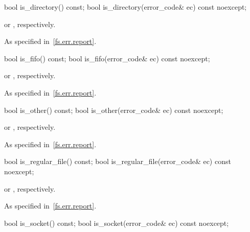 %
\begin{itemdecl}
bool is_directory() const;
bool is_directory(error_code& ec) const noexcept;
\end{itemdecl}

\begin{itemdescr}
\pnum
\returns
{} or , respectively.

\pnum
\throws
As specified in~\ref{fs.err.report}.
\end{itemdescr}

%
\begin{itemdecl}
bool is_fifo() const;
bool is_fifo(error_code& ec) const noexcept;
\end{itemdecl}

\begin{itemdescr}
\pnum
\returns
{} or , respectively.

\pnum
\throws
As specified in~\ref{fs.err.report}.
\end{itemdescr}

%
\begin{itemdecl}
bool is_other() const;
bool is_other(error_code& ec) const noexcept;
\end{itemdecl}

\begin{itemdescr}
\pnum
\returns
{} or , respectively.

\pnum
\throws
As specified in~\ref{fs.err.report}.
\end{itemdescr}

%
\begin{itemdecl}
bool is_regular_file() const;
bool is_regular_file(error_code& ec) const noexcept;
\end{itemdecl}

\begin{itemdescr}
\pnum
\returns
{} or , respective\-ly.

\pnum
\throws
As specified in~\ref{fs.err.report}.
\end{itemdescr}

%
\begin{itemdecl}
bool is_socket() const;
bool is_socket(error_code& ec) const noexcept;
\end{itemdecl}


